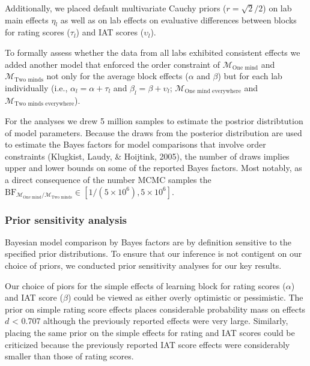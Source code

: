 \documentclass[
  doc]{apa6}
\begin{document}
Additionally, we placed default multivariate Cauchy priors (\(r = \sqrt2/2\)) on lab main effects \(\eta_l\) as well as on lab effects on evaluative differences between blocks for rating scores (\(\tau_l\)) and IAT scores (\(\upsilon_l\)).

To formally assess whether the data from all labs exhibited consistent effects we added another model that enforced the order constraint of \(\mathcal{M}_\textrm{One mind}\) and \(\mathcal{M}_\textrm{Two minds}\) not only for the average block effects (\(\alpha\) and \(\beta\)) but for each lab individually (i.e., \(\alpha_l = \alpha + \tau_l\) and \(\beta_l = \beta + \upsilon_l\); \(\mathcal{M}_\textrm{One mind everywhere}\) and \(\mathcal{M}_\textrm{Two minds everywhere}\)).

For the analyses we drew 5 million samples to estimate the postrior distribtution of model parameters.
Because the draws from the posterior distribution are used to estimate the Bayes factors for model comparisons that involve order constraints (Klugkist, Laudy, \& Hoijtink, 2005), the number of draws implies upper and lower bounds on some of the reported Bayes factors.
Most notably, as a direct consequence of the number MCMC samples the \(\textrm{BF}_{\mathcal{M}_\textrm{One mind}/\mathcal{M}_\textrm{Two minds}} \in [1 / (5 \times 10^6), 5 \times 10^6]\).

\hypertarget{prior-sensitivity-analysis}{%
\subsubsection{Prior sensitivity analysis}\label{prior-sensitivity-analysis}}

Bayesian model comparison by Bayes factors are by definition sensitive to the specified prior distributions.
To ensure that our inference is not contigent on our choice of priors, we conducted prior sensitivity analyses for our key results.

Our choice of piors for the simple effects of learning block for rating scores (\(\alpha\)) and IAT score (\(\beta\)) could be viewed as either overly optimistic or pessimistic.
The prior on simple rating score effects places considerable probability mass on effects \(d\) \textless{} 0.707 although the previously reported effects were very large.
Similarly, placing the same prior on the simple effects for rating and IAT scores could be criticized because the previously reported IAT score effects were considerably smaller than those of rating scores.
\end{document}
